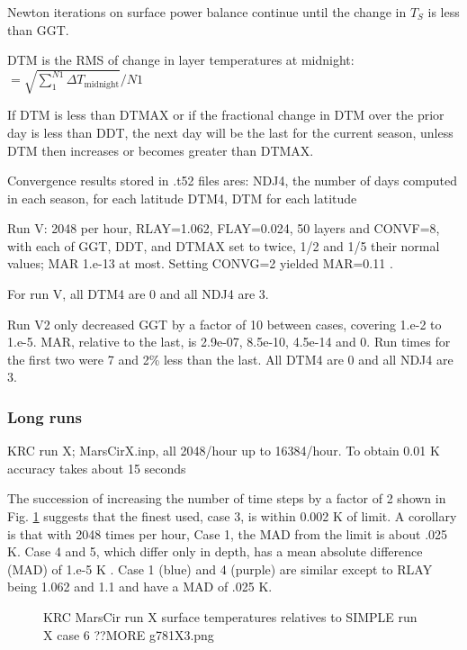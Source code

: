 \documentclass{article}
\begin{document}
Newton iterations on surface power balance continue until the change in $T_S$ is less than GGT.

DTM is the RMS of change in layer temperatures at midnight: $=\sqrt{ \sum_1^{N1} \Delta T_\mathrm{midnight} } / N1 $

If DTM is less than DTMAX or if the fractional change in DTM over the prior day is less than DDT, the next day will be the last for the current season, unless DTM then increases or becomes greater than DTMAX. 

Convergence results stored in .t52 files ares:
 \qi NDJ4, the number of days computed in each season, for each latitude
\qi DTM4, DTM for each latitude

Run V:  2048  per hour, RLAY=1.062, FLAY=0.024, 50 layers and CONVF=8, with each of GGT, DDT, and DTMAX set to twice, 1/2 and 1/5 their normal values; MAR 1.e-13 at most. Setting CONVG=2 yielded MAR=0.11 .

For run V,  all DTM4 are 0 and all NDJ4 are 3.

Run V2 only decreased GGT by a factor of 10 between cases, covering 1.e-2 to 1.e-5. MAR, relative to the last, is  2.9e-07,   8.5e-10,   4.5e-14 and 0. Run times for the first two were 7 and 2\% less than the last.  All DTM4 are 0 and all NDJ4 are 3.


\subsubsection{Long runs} %

KRC run X; MarsCirX.inp, all 2048/hour up to 16384/hour.
\qi To obtain 0.01 K accuracy takes about 15 seconds  

The succession of increasing the number of time steps by a factor of 2 shown in
Fig. \ref{g781X3} suggests that the finest used, case 3, is within 0.002 K of
limit.  A corollary is that with 2048 times per hour, Case 1, the MAD from the
limit is about .025 K.  Case 4 and 5, which differ only in depth, has a mean
absolute difference (MAD) of 1.e-5 K . Case 1 (blue) and 4 (purple) are similar
except to RLAY being 1.062 and 1.1 and have a MAD of .025 K.

\begin{figure}[!ht] 
\caption[KRC relative to SIMPLE:6]{ KRC MarsCir run X surface temperatures relatives to SIMPLE run X case 6 ??MORE 
\label{g781X3} g781X3.png  }
\end{figure} 
\end{document}
